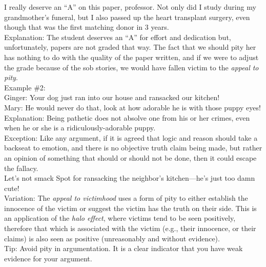 \documentclass[a4paper,12pt,single,pdftex]{scrbook}
\begin{document}
    
      I really deserve an “A” on this paper, professor.  Not only did I study during my grandmother’s funeral, but I also passed up the heart transplant surgery, even though that was the first matching donor in 3 years.
    \\

    
      Explanation: The student deserves an “A” for effort and dedication but, unfortunately, papers are not graded that way.  The fact that we should pity her has nothing to do with the quality of the paper written, and if we were to adjust the grade because of the sob stories, we would have fallen victim to the {\it appeal to pity}.
    \\

    
      Example \#2:
    \\

    
      Ginger: Your dog just ran into our house and ransacked our kitchen!
    \\

    
      Mary: He would never do that, look at how adorable he is with those puppy eyes!
    \\

    
      Explanation: Being pathetic does not absolve one from his or her crimes, even when he or she is a ridiculously-adorable puppy.
    \\

    
      Exception: Like any argument, if it is agreed that logic and reason should take a backseat to emotion, and there is no objective truth claim being made, but rather an opinion of something that should or should not be done, then it could escape the fallacy.
    \\

    
      Let's not smack Spot for ransacking the neighbor's kitchen—he's just too damn cute!
    \\

    
      Variation: The {\em appeal to victimhood} uses a form of pity to either establish the innocence of the victim or suggest the victim has the truth on their side. This is an application of the {\em halo effect}, where victims tend to be seen positively, therefore that which is associated with the victim (e.g., their innocence, or their claims) is also seen as positive (unreasonably and without evidence).
    \\

    
      Tip: Avoid pity in argumentation.  It is a clear indicator that you have weak evidence for your argument.
    \\
\end{document}
